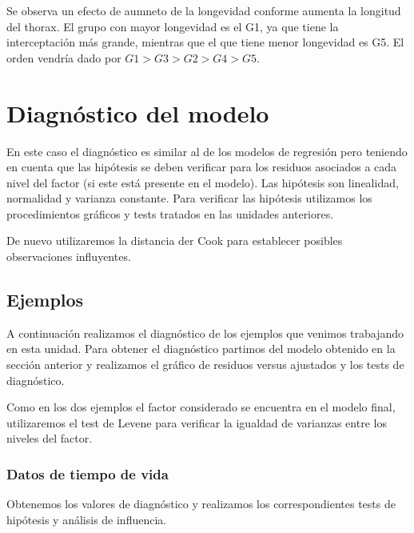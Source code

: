 \documentclass[
]{book}
\theoremstyle{definition}
\theoremstyle{definition}
\theoremstyle{definition}
\theoremstyle{remark}
\begin{document}
Se observa un efecto de aumneto de la longevidad conforme aumenta la longitud del thorax. El grupo con mayor longevidad es el G1, ya que tiene la interceptación más grande, mientras que el que tiene menor longevidad es G5. El orden vendría dado por \(G1 > G3 > G2 > G4 > G5\).

\hypertarget{diagnuxf3stico-del-modelo}{%
\section{Diagnóstico del modelo}\label{diagnuxf3stico-del-modelo}}

En este caso el diagnóstico es similar al de los modelos de regresión pero teniendo en cuenta que las hipótesis se deben verificar para los residuos asociados a cada nivel del factor (si este está presente en el modelo). Las hipótesis son linealidad, normalidad y varianza constante. Para verificar las hipótesis utilizamos los procedimientos gráficos y tests tratados en las unidades anteriores.

De nuevo utilizaremos la distancia der Cook para establecer posibles observaciones influyentes.

\hypertarget{ejemplos-1}{%
\subsection{Ejemplos}\label{ejemplos-1}}

A continuación realizamos el diagnóstico de los ejemplos que venimos trabajando en esta unidad. Para obtener el diagnóstico partimos del modelo obtenido en la sección anterior y realizamos el gráfico de residuos versus ajustados y los tests de diagnóstico.

Como en los dos ejemplos el factor considerado se encuentra en el modelo final, utilizaremos el test de Levene para verificar la igualdad de varianzas entre los niveles del factor.

\hypertarget{datos-de-tiempo-de-vida-1}{%
\subsubsection{Datos de tiempo de vida}\label{datos-de-tiempo-de-vida-1}}

Obtenemos los valores de diagnóstico y realizamos los correspondientes tests de hipótesis y análisis de influencia.
\end{document}
